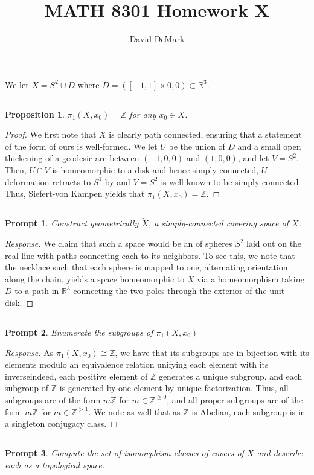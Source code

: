 \documentclass[english]{article}
\title{MATH 8301 Homework X}
\author{David DeMark}
\date{\due}
\newcommand{\RR}{\mathbb{R}}
\newcommand{\ZZ}{\mathbb{Z}}
\newcommand{\prob}[1]{\setcounter{section}{#1-1}\section{}}
\newcommand{\prt}[1]{\setcounter{subsection}{#1-1}\subsection{}}
\newtheorem*{proposition*}{Proposition}
\newtheorem*{prompt*}{Prompt}
\theoremstyle{remark}
\theoremstyle{definition}
\begin{document}
\maketitle
\prob{1} We let $X=S^2\cup D$ where $D= ([-1,1]\times {0,0})\subset \RR^3$. \prt{1}
\begin{proposition*}
	$\pi_1(X,x_0)=\ZZ$ for any $x_0\in X$. 
\end{proposition*}
\begin{proof}
We first note that $X$ is clearly path connected, ensuring that a statement of the form of ours is well-formed. We let $U$ be the union of $D$ and a small open thickening of a geodesic arc between $(-1,0,0)$ and $(1,0,0)$, and let $V=S^2$. Then, $U\cap V$ is homeomorphic to a disk and hence simply-connected, $U$ deformation-retracts to $S^1$ by  and $V=S^2$ is well-known to be simply-connected. Thus, Siefert-von Kampen yields that $\pi_1(X,x_0)=\ZZ$.
\end{proof}
\prt{2}\begin{prompt*}
	Construct geometrically $\tilde{X}$, a simply-connected covering space of $X$.
\end{prompt*}
\begin{proof}[Response]
	We claim that such a space would be an  of spheres $S^2$ laid out on the real line with paths connecting each to its neighbors. To see this, we note that  the necklace such that each sphere is mapped to one, alternating orientation along the chain, yields a space homeomorphic to $X$ via a homeomorphism taking $D$ to a path in $\RR^3$ connecting the two poles through the exterior of the unit disk.
\end{proof}
\prt{3}\begin{prompt*}
	Enumerate the subgroups of $\pi_1(X,x_0)$
\end{prompt*}
\begin{proof}[Response]
	As $\pi_1(X,x_0)\cong \ZZ$, we have that its subgroups are in bijection with its elements modulo an equivalence relation unifying each element with its inverse\textemdash indeed, each positive element of $\ZZ$ generates a unique subgroup, and each subgroup of $\ZZ$ is generated by one element by unique factorization. Thus, all subgroups are of the form $m\ZZ$ for $m\in \ZZ^{\geq 0}$, and all proper subgroups are of the form $m\ZZ$ for $m\in \ZZ^{>1}$. We note as well that as $\ZZ$ is Abelian, each subgroup is in a singleton conjugacy class.
\end{proof}
\prt{4}
\begin{prompt*}
	Compute the set of isomorphism classes of covers of $X$ and describe each as a topological space.
\end{prompt*}
\end{document}
